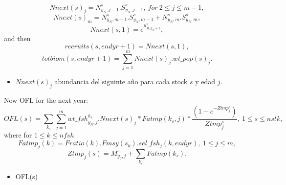 \documentclass{article}
\begin{document}
\begin{equation}
Nnext(s)_j=N^s_{y_N,j-1}.S^s_{y_N,j-1}, \ for \ 2\leq j\leq m-1,
\end{equation}
\begin{equation}
Nnext(s)_m=N^s_{y_N,m-1}.S^s_{y_N,m-1}+N^s_{y_N,m}.S^s_{y_N,m},
\end{equation}
\begin{equation}
    Nnext(s,1)=e^{\mu^s_{R,y_N+1}},
\end{equation}
and then
\begin{equation}
recruits(s,endyr+1)=Nnext(s,1),
\end{equation}
\begin{equation}
totbiom(s,endyr+1)=\sum_{j=1}^mNnext(s)_j.wt\_pop(s)_j.
\end{equation}
\begin{itemize}
    \item $Nnext(s)_j$ abundancia del siguinte año para cada stock $s$ y edad $j$.

\end{itemize}
Now OFL for the next year:
\begin{equation}
    OFL(s) =\sum_{k_s} \sum_{j=1}^mwt\_fsh^{k_s}_{y_N,j} . Nnext(s)_j * Fatmp(k_s,j) * \dfrac{(1 - e^{-Ztmp^s_j})}{Ztmp^s_j}, \ 1\leq s \leq nstk,
\end{equation}
where for $1\leq k \leq nfsh$ 
\begin{equation}
    Fatmp_j(k)=Fratio(k).Fmsy(s_k).sel\_fsh_j(k,endyr), \  1\leq j \leq m,
\end{equation}
\begin{equation}
    Ztmp_j(s)=M^s_{y_0,j}+ \sum_{k_s}Fatmp(k_s).
\end{equation}
\begin{itemize}
    \item OFL(s)
\end{itemize}
\end{document}
